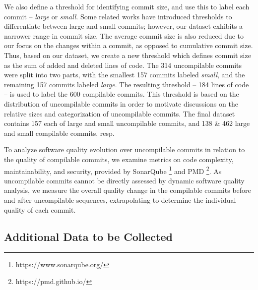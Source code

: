 We also define a threshold for identifying commit size, and use this to label each commit -- \textit{large} or \textit{small}. 
Some related works have introduced thresholds to differentiate between large and small commits; however, our dataset exhibits a narrower range in commit size. 
The average commit size is also reduced due to our focus on the changes within a commit, as opposed to cumulative commit size. 
Thus, based on our dataset, we create a new threshold which defines commit size as the sum of added and deleted lines of code. The 314 uncompilable commits were split into two parts, with the smallest 157 commits labeled \textit{small}, and the remaining 157 commits labeled \textit{large}. 
The resulting threshold -- 184 lines of code -- is used to label the 600 compilable commits.
This threshold is based on the distribution of uncompilable commits in order to motivate discussions on the relative sizes and categorization of uncompilable commits. The final dataset contains 157 each of large and small uncompilable commits, and 138 \& 462 large and small compilable commits, resp.

To analyze software quality evolution over uncompilable commits in relation to the quality of compilable commits, we examine metrics on code complexity, maintainability, and security, provided by SonarQube \footnote{https://www.sonarqube.org/} and PMD \footnote{https://pmd.github.io/}. As uncompilable commits cannot be directly assessed by dynamic software quality analysis, we measure the overall quality change in the compilable commits before and after uncompilable sequences, extrapolating to determine the individual quality of each commit. 


\subsection{Additional Data to be Collected}
